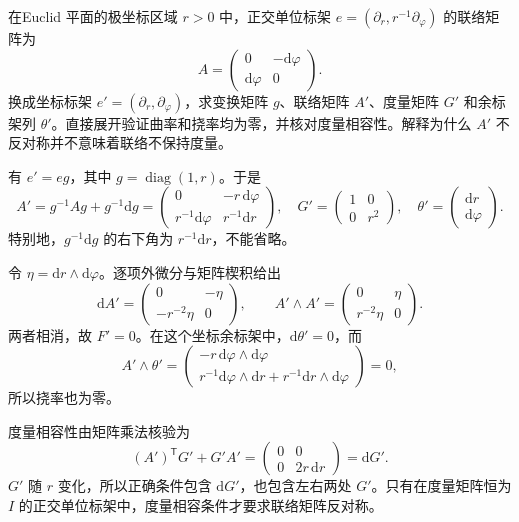 \begin{exercise}\label{g1:ex:connection-check-polar-coordinate}
	在Euclid 平面的极坐标区域 \(r>0\) 中，正交单位标架 \(e=(\partial_r,r^{-1}\partial_\varphi)\) 的联络矩阵为
	\[
		A=\begin{pmatrix}0&-\mathrm{d}\varphi\\
		\mathrm{d}\varphi&0\end{pmatrix}.
	\]
	换成坐标标架 \(e'=(\partial_r,\partial_\varphi)\)，求变换矩阵 \(g\)、联络矩阵 \(A'\)、度量矩阵 \(G'\) 和余标架列 \(\theta'\)。直接展开验证曲率和挠率均为零，并核对度量相容性。解释为什么 \(A'\) 不反对称并不意味着联络不保持度量。
\end{exercise}
\begin{solution}
	有 \(e'=eg\)，其中 \(g=\operatorname{diag}(1,r)\)。于是
	\[
		A'=g^{-1}Ag+g^{-1}\mathrm{d}g
		=\begin{pmatrix}
			0&-r\,\mathrm{d}\varphi\\
			r^{-1}\mathrm{d}\varphi&r^{-1}\mathrm{d}r
		\end{pmatrix},
		\quad
		G'=\begin{pmatrix}1&0\\0&r^2\end{pmatrix},
		\quad
		\theta'=\begin{pmatrix}\mathrm{d}r\\\mathrm{d}\varphi\end{pmatrix}.
	\]
	特别地，\(g^{-1}\mathrm{d}g\) 的右下角为 \(r^{-1}\mathrm{d}r\)，不能省略。

	令 \(\eta=\mathrm{d}r\wedge\mathrm{d}\varphi\)。逐项外微分与矩阵楔积给出
	\[
		\mathrm{d}A'
		=\begin{pmatrix}0&-\eta\\-r^{-2}\eta&0\end{pmatrix},
		\qquad
		A'\wedge A'
		=\begin{pmatrix}0&\eta\\r^{-2}\eta&0\end{pmatrix}.
	\]
	两者相消，故 \(F'=0\)。在这个坐标余标架中，\(\mathrm{d}\theta'=0\)，而
	\[
		A'\wedge\theta'
		=\begin{pmatrix}
			-r\,\mathrm{d}\varphi\wedge\mathrm{d}\varphi\\
			r^{-1}\mathrm{d}\varphi\wedge\mathrm{d}r+
			r^{-1}\mathrm{d}r\wedge\mathrm{d}\varphi
		\end{pmatrix}=0,
	\]
	所以挠率也为零。

	度量相容性由矩阵乘法核验为
	\[
		(A')^{\mathsf T}G'+G'A'
		=\begin{pmatrix}0&0\\0&2r\,\mathrm{d}r\end{pmatrix}
		=\mathrm{d}G'.
	\]
	\(G'\) 随 \(r\) 变化，所以正确条件包含 \(\mathrm{d}G'\)，也包含左右两处 \(G'\)。只有在度量矩阵恒为 \(I\) 的正交单位标架中，度量相容条件才要求联络矩阵反对称。
\end{solution}

